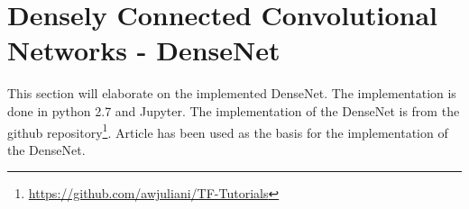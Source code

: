 \section{Densely Connected Convolutional Networks - DenseNet}

This section will elaborate on the implemented DenseNet. The implementation is done in python 2.7 and Jupyter. The implementation of the DenseNet is from the github repository\footnote{\url{https://github.com/awjuliani/TF-Tutorials}}. Article \citep{DENSE} has been used as the basis for the implementation of the DenseNet.